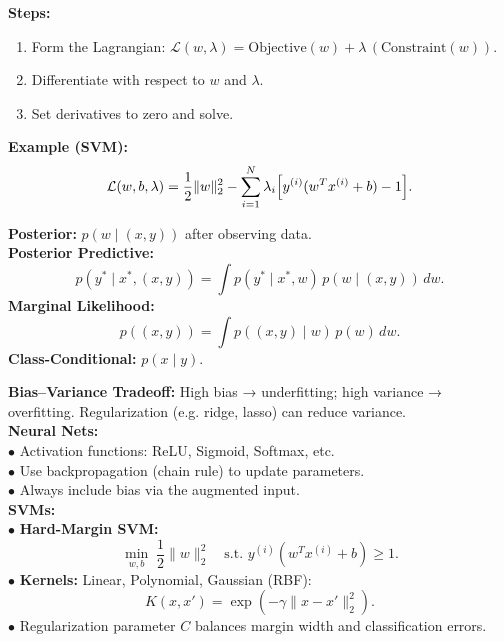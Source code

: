 \documentclass[10pt]{article}
\begin{document}
\begin{multicols}{2}
\begin{tcolorbox}[title=Lagrangian Method]
\textbf{Steps:}
\begin{enumerate}[noitemsep, topsep=0pt]
  \item Form the Lagrangian: \(\mathcal{L}(w,\lambda)=\text{Objective}(w)+\lambda\,(\text{Constraint}(w))\).
  \item Differentiate with respect to \(w\) and \(\lambda\).
  \item Set derivatives to zero and solve.
\end{enumerate}
\textbf{Example (SVM):}
\[
\mathcal{L}(w,b,\lambda)=\frac{1}{2}\|w\|_2^2-\sum_{i=1}^N\lambda_i\Bigl[y^{(i)}(w^Tx^{(i)}+b)-1\Bigr].
\]
\end{tcolorbox}

\begin{tcolorbox}[title=Terminology]
\textbf{Posterior:} \(p(w\mid(x,y))\) after observing data.\\[1mm]
\textbf{Posterior Predictive:}
\[
p(y^*\mid x^*,(x,y))=\int p(y^*\mid x^*,w)\,p(w\mid(x,y))\,dw.
\]
\textbf{Marginal Likelihood:}
\[
p((x,y))=\int p((x,y)\mid w)\,p(w)\,dw.
\]
\textbf{Class-Conditional:} \(p(x\mid y)\).
\end{tcolorbox}

\begin{tcolorbox}[title=Bias--Variance]
\textbf{Bias--Variance Tradeoff:} High bias → underfitting; high variance → overfitting. Regularization (e.g. ridge, lasso) can reduce variance.\\[1mm]
\textbf{Neural Nets:}\\
\(\bullet\) Activation functions: ReLU, Sigmoid, Softmax, etc.\\[0.5mm]
\(\bullet\) Use backpropagation (chain rule) to update parameters.\\[0.5mm]
\(\bullet\) Always include bias via the augmented input.\\[1mm]
\textbf{SVMs:}\\
\(\bullet\) \textbf{Hard-Margin SVM:}
\[
\min_{w,b}\;\frac{1}{2}\|w\|_2^2\quad\text{s.t. }y^{(i)}(w^Tx^{(i)}+b)\ge 1.
\]
\(\bullet\) \textbf{Kernels:} Linear, Polynomial, Gaussian (RBF):
\[
K(x,x')=\exp(-\gamma\|x-x'\|_2^2).
\]
\(\bullet\) Regularization parameter \(C\) balances margin width and classification errors.
\end{tcolorbox}

\end{multicols}
\end{document}
